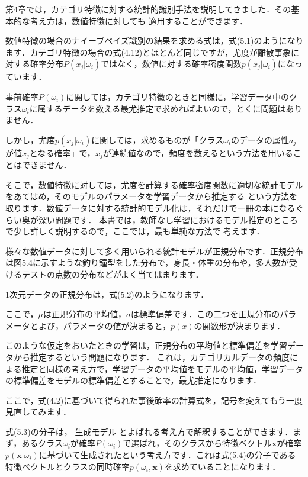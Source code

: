 
第4章では，カテゴリ特徴に対する統計的識別手法を説明してきました．その基本的な考え方は，数値特徴に対しても
適用することができます．

数値特徴の場合のナイーブベイズ識別の結果を求める式は，式(5.1)のようになります．カテゴリ特徴の場合の式(4.12)とほとんど同じですが，尤度が離散事象に対する確率分布$P(x_j|\omega_i)$ではなく，数値に対する確率密度関数$p(x_j|\omega_i)$になっています．

事前確率$P(\omega_i)$に関しては，カテゴリ特徴のときと同様に，学習データ中のクラス$\omega_i$に属するデータを数える最尤推定で求めればよいので，とくに問題はありません．

しかし，尤度$p(x_j \vert \omega_i)$に関しては，求めるものが「クラス$\omega_i$のデータの属性$a_j$が値$x_j$となる確率」で，$x_j$が連続値なので，頻度を数えるという方法を用いることはできません．

そこで，数値特徴に対しては，尤度を計算する確率密度関数に適切な統計モデルをあてはめ，そのモデルのパラメータを学習データから推定する
という方法を取ります．数値データに対する統計的モデル化は，それだけで一冊の本になるぐらい奥が深い問題です．
本書では，教師なし学習におけるモデル推定のところで少し詳しく説明するので，ここでは，最も単純な方法で
考えます．

様々な数値データに対して多く用いられる統計モデルが正規分布です．正規分布は図5.4に示すような釣り鐘型をした分布で，身長・体重の分布や，多人数が受けるテストの点数の分布などがよく当てはまります．

1次元データの正規分布は，式(5.2)のようになります．

ここで，$\mu$は正規分布の平均値，$\sigma$は標準偏差です．この二つを正規分布のパラメータとよび，パラメータの値が決まると，$p(x)$の関数形が決まります．

このような仮定をおいたときの学習は，正規分布の平均値と標準偏差を学習データから推定するという問題になります．
これは，カテゴリカルデータの頻度による推定と同様の考え方で，学習データの平均値をモデルの平均値，学習データの標準偏差をモデルの標準偏差とすることで，最尤推定になります．


ここで，式(4.2)に基づいて得られた事後確率の計算式を，記号を変えてもう一度見直してみます．

式(5.3)の分子は，
生成モデル
とよばれる考え方で解釈することができます．まず，あるクラス$\omega_i$が確率$P(\omega_i)$で選ばれ，そのクラスから特徴ベクトル$\bm{x}$が確率$p(\bm{x} \vert \omega_i)$に基づいて生成されたという考え方です．これは式(5.4)の分子である特徴ベクトルとクラスの同時確率$p(\omega_i, \bm{x})$を求めていることになります．

